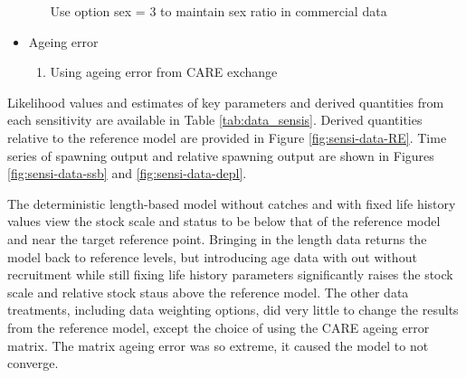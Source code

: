 \documentclass[11pt,
  english,
  a4paper,
]{article}
\begin{document}
\begin{itemize}
\begin{enumerate}
    Use option sex = 3 to maintain sex ratio in commercial data\\

    \tagmcend\tagstructend\tagstructend

    \tagmcend\tagstructend\tagstructend
  \end{enumerate}

  \tagstructend
\item

  Ageing error

  \tagmcend\tagstructend\tagstructend


  \begin{enumerate}
  \def\labelenumi{\arabic{enumi}.}
  \setcounter{enumi}{12}
  \item


    Using ageing error from CARE exchange

    \tagmcend\tagstructend\tagstructend

    \tagmcend\tagstructend\tagstructend
  \end{enumerate}

  \tagstructend
\end{itemize}

\tagstructend


Likelihood values and estimates of key parameters and derived quantities from each sensitivity are available in Table \ref{tab:data_sensis}. Derived quantities relative to the reference model are provided in Figure \ref{fig:sensi-data-RE}. Time series of spawning output and relative spawning output are shown in Figures \ref{fig:sensi-data-ssb} and \ref{fig:sensi-data-depl}.

\leavevmode\tagmcend\tagstructend\par


The deterministic length-based model without catches and with fixed life history values view the stock scale and status to be below that of the reference model and near the target reference point. Bringing in the length data returns the model back to reference levels, but introducing age data with out without recruitment while still fixing life history parameters significantly raises the stock scale and relative stock staus above the reference model. The other data treatments, including data weighting options, did very little to change the results from the reference model, except the choice of using the CARE ageing error matrix. The matrix ageing error was so extreme, it caused the model to not converge.
\end{document}

